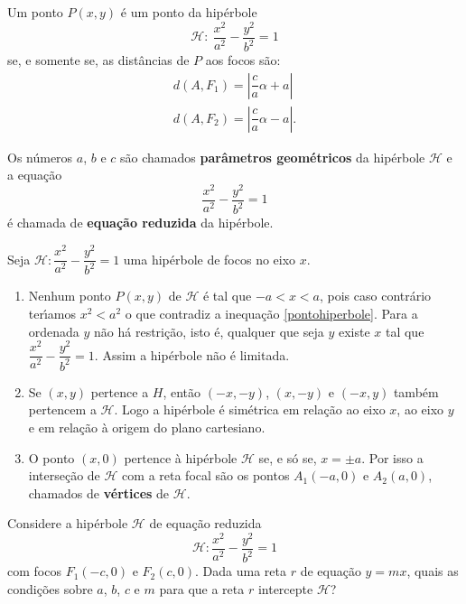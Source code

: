 \begin{proposicao}
  Um ponto $P(x, y)$ \'e um ponto da hip\'erbole
  \[
    \mathcal{H}:\ \dfrac{x^2}{a^2} - \dfrac{y^2}{b^2} = 1
  \]
  se, e somente se, as dist\^ancias de $P$ aos focos s\~ao:
  \begin{align*}
    d(A,F_1) = \left|\dfrac{c}{a}\alpha + a\right|\\
    d(A,F_2) = \left|\dfrac{c}{a}\alpha - a\right|.
  \end{align*}
\end{proposicao}

Os n\'umeros $a$, $b$ e $c$ s\~ao chamados \textbf{par\^ametros geom\'etricos} da hip\'erbole $\mathcal{H}$ e a equa\c{c}\~ao
\[
  \dfrac{x^2}{a^2} - \dfrac{y^2}{b^2} = 1
\]
\'e chamada de \textbf{equa\c{c}\~ao reduzida} da hip\'erbole. 

\begin{observacao}
  Seja $\mathcal{H} : \dfrac{x^2}{a^2} - \dfrac{y^2}{b^2} = 1$ uma hip\'erbole de focos no eixo $x$.
  \begin{enumerate}
    \item Nenhum ponto $P(x,y)$ de $\mathcal{H}$ \'e tal que $-a < x < a$, pois caso contr\'ario ter{\'\i}amos $x^2 < a^2$ o que contradiz a inequa\c{c}\~ao \eqref{pontohiperbole}. Para a ordenada $y$ n\~ao h\'a restri\c{c}\~ao, isto \'e, qualquer que seja $y$ existe $x$ tal que $\dfrac{x^2}{a^2} - \dfrac{y^2}{b^2} = 1$. Assim a hip\'erbole n\~ao \'e limitada.
    \item Se $(x,y)$ pertence a $H$, ent\~ao $(-x,-y)$, $(x,-y)$ e $(-x,y)$ tamb\'em pertencem a $\mathcal{H}$. Logo a hip\'erbole \'e sim\'etrica em rela\c{c}\~ao ao eixo $x$, ao eixo $y$  e em rela\c{c}\~ao \`a origem do plano cartesiano.
    \item O ponto $(x,0)$ pertence \`a hip\'erbole $\mathcal{H}$ se, e s\'o se, $x = \pm a$. Por isso a interse\c{c}\~ao de $\mathcal{H}$ com a reta focal s\~ao os pontos $A_1(-a,0)$ e $A_2(a,0)$, chamados de \textbf{v\'ertices} de $\mathcal{H}$.
  \end{enumerate}
\end{observacao}

Considere a hip\'erbole $\mathcal{H}$ de equa\c{c}\~ao reduzida
\[
  \mathcal{H} : \dfrac{x^2}{a^2} - \dfrac{y^2}{b^2} = 1
\]
com focos $F_1(-c,0)$ e $F_2(c,0)$. Dada uma reta $r$ de equa\c{c}\~ao $y = mx$, quais as condi\c{c}\~oes sobre $a$, $b$, $c$ e $m$ para que a reta $r$ intercepte $\mathcal{H}$?


